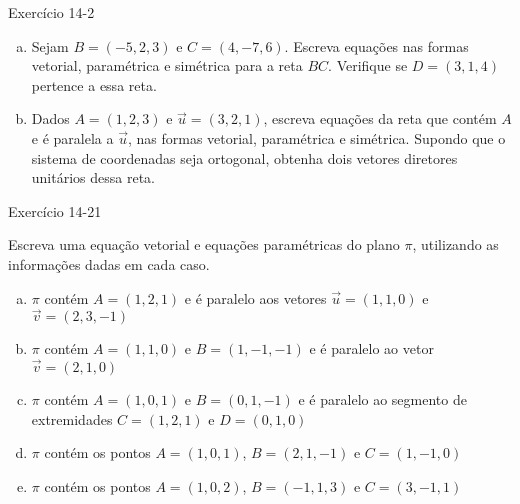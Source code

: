 \begin{frame}{Exercício 14-2}
    \begin{minipage}{\textwidth}
        \begin{enumerate}[(a)]
            \item Sejam \(B=(-5,2,3)\) e \(C=(4,-7,6)\). Escreva equações nas
                formas vetorial, paramétrica e simétrica para a reta \(BC\).
                Verifique se \(D=(3,1,4)\) pertence a essa reta.
            \item Dados \(A=(1,2,3)\) e \(\vec{u}=(3,2,1)\), escreva equações
                da reta que contém \(A\) e é paralela a \(\vec{u}\), nas formas
                vetorial, paramétrica e simétrica. Supondo que o sistema de coordenadas
                seja ortogonal, obtenha dois vetores diretores unitários dessa reta.
        \end{enumerate}
    \end{minipage}
\end{frame}

\begin{frame}{Exercício 14-21}
    \begin{minipage}{\textwidth}
        Escreva uma equação vetorial e equações paramétricas do plano \(\pi\),
        utilizando as informações dadas em cada caso.
        \begin{enumerate}[(a)]
            \item \(\pi\) contém \(A=(1,2,1)\) e é paralelo aos vetores \(\vec{u}=(1,1,0)\) e
                \(\vec{v}=(2,3,-1)\)
            \item \(\pi\) contém \(A=(1,1,0)\) e \(B=(1,-1,-1)\) e é paralelo ao vetor
                \(\vec{v}=(2,1,0)\)
            \item \(\pi\) contém \(A=(1,0,1)\) e \(B=(0,1,-1)\) e é paralelo ao segmento de
                extremidades \(C=(1,2,1)\) e \(D=(0,1,0)\)
            \item \(\pi\) contém os pontos \(A=(1,0,1)\), \(B=(2,1,-1)\) e \(C=(1,-1,0)\)
            \item \(\pi\) contém os pontos \(A=(1,0,2)\), \(B=(-1,1,3)\) e \(C=(3,-1,1)\)
        \end{enumerate}
    \end{minipage}
\end{frame}

